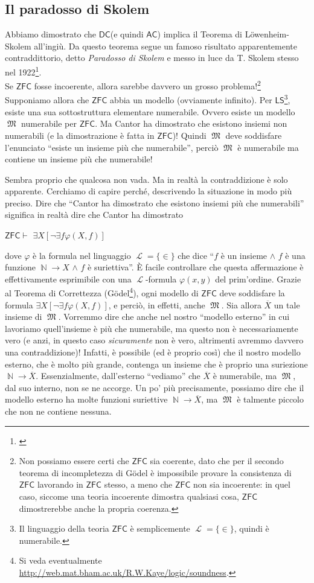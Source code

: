 \documentclass[12pt,a4paper]{report}
\theoremstyle{definition}
\theoremstyle{num.custom-title}
\DeclareMathOperator{\LL}{\mathcal{L}}
\DeclareMathOperator{\N}{\mathbb{N}}
\DeclareMathOperator{\M}{\mathfrak{M}}
\newcommand{\AC}{\ensuremath{\mathsf{AC}}\xspace}
\newcommand{\DC}{\ensuremath{\mathsf{DC}}\xspace}
\newcommand{\ZFC}{\ensuremath{\mathsf{ZFC}}\xspace}
\newcommand{\LS}{\ensuremath{\mathsf{LS}}\xspace}
\renewcommand{\phi}{\varphi}
\begin{document}
\subsection{Il paradosso di Skolem}

Abbiamo dimostrato che \DC (e quindi \AC) implica il Teorema di Löwenheim-Skolem all'ingiù. Da questo teorema segue un famoso risultato apparentemente contraddittorio, detto \emph{Paradosso di Skolem} e messo in luce da T. Skolem stesso nel 1922\footnote{\cite{Sko22:wiki}}.\\

Se \ZFC fosse incoerente, allora sarebbe davvero un grosso problema!\footnote{Non possiamo essere certi che \ZFC sia coerente, dato che per il secondo teorema di incompletezza di Gödel è impossibile provare la consistenza di \ZFC lavorando in \ZFC stesso, a meno che \ZFC non sia incoerente: in quel caso, siccome una teoria incoerente dimostra qualsiasi cosa, \ZFC dimostrerebbe anche la propria coerenza.} Supponiamo allora che \ZFC abbia un modello (ovviamente infinito). Per \LS\footnote{Il linguaggio della teoria \ZFC è semplicemente $\LL=\{\in\}$, quindi è numerabile.}, esiste una sua sottostruttura elementare numerabile. Ovvero esiste un modello $\M$ numerabile per \ZFC. Ma Cantor ha dimostrato che esistono insiemi non numerabili (e la dimostrazione è fatta in \ZFC)! Quindi $\M$ deve soddisfare l'enunciato ``esiste un insieme più che numerabile'', perciò $\M$ è numerabile ma contiene un insieme più che numerabile!

Sembra proprio che qualcosa non vada. Ma in realtà la contraddizione è solo apparente. Cerchiamo di capire perché, descrivendo la situazione in modo più preciso. 
Dire che ``Cantor ha dimostrato che esistono insiemi più che numerabili'' significa in realtà dire che Cantor ha dimostrato
\begin{center}
\ZFC $\vdash$ $\exists X [\neg \exists f \phi(X,f)]$
\end{center}
dove $\phi$ è la formula nel linguaggio $\LL=\{\in\}$ che dice ``$f$ è un insieme $\wedge$ $f$ è una funzione $\N \to X$ $\wedge$ $f$ è suriettiva''. È facile controllare che questa affermazione è effettivamente esprimibile con una $\LL$-formula $\phi(x,y)$ del prim'ordine. Grazie al Teorema di Correttezza (Gödel\footnote{Si veda eventualmente \url{http://web.mat.bham.ac.uk/R.W.Kaye/logic/soundness}.}), ogni modello di \ZFC deve soddisfare la formula $\exists X [\neg \exists f \phi(X,f)]$, e perciò, in effetti, anche $\M$. Sia allora $\overline{X}$ un tale insieme di $\M$. Vorremmo dire che anche nel nostro ``modello esterno'' in cui lavoriamo quell'insieme è più che numerabile, ma questo non è necessariamente vero (e anzi, in questo caso \emph{sicuramente} non è vero, altrimenti avremmo davvero una contraddizione)! Infatti, è possibile (ed è proprio così) che il nostro modello esterno, che è molto più grande, contenga un insieme che è proprio una suriezione $\N \to \overline{X}$. Essenzialmente, dall'esterno ``vediamo'' che $\overline{X}$ è numerabile, ma $\M$, dal suo interno, non se ne accorge. Un po' più precisamente, possiamo dire che il modello esterno ha molte funzioni suriettive $\N \to \overline{X}$, ma $\M$ è talmente piccolo che non ne contiene nessuna. 
\end{document}
